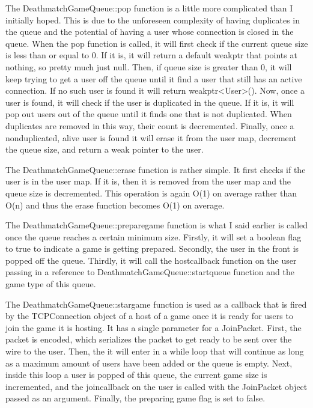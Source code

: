 \documentclass[conference]{IEEEtran}
\begin{document}
The DeathmatchGameQueue::pop function is a little more complicated than I initially hoped.
This is due to the unforeseen complexity of having duplicates in the queue and the potential of having a user whose connection is closed in the queue.
When the pop function is called, it will first check if the current queue size is less than or equal to 0.
If it is, it will return a default weak\textunderscore ptr that points at nothing, so pretty much just null.
Then, if queue size is greater than 0, it will keep trying to get a user off the queue until it find a user that still has an active connection.
If no such user is found it will return weak\textunderscore ptr<User>().
Now, once a user is found, it will check if the user is duplicated in the queue.
If it is, it will pop out users out of the queue until it finds one that is not duplicated.
When duplicates are removed in this way, their count is decremented.
Finally, once a nonduplicated, alive user is found it will erase it from the user map, decrement the queue size, and return a weak pointer to the user.

The DeathmatchGameQueue::erase function is rather simple.
It first checks if the user is in the user map.
If it is, then it is removed from the user map and the queue size is decremented.
This operation is again O(1) on average rather than O(n) and thus the erase function becomes O(1) on average.

The DeathmatchGameQueue::prepare\textunderscore game function is what I said earlier is called once the queue reaches a certain minimum size.
Firstly, it will set a boolean flag to true to indicate a game is getting prepared.
Secondly, the user in the front is popped off the queue.
Thirdly, it will call the host\textunderscore callback function on the user passing in a reference to DeathmatchGameQueue::start\textunderscore queue function and the game type of this queue.

The DeathmatchGameQueue::star\textunderscore game function is used as a callback that is fired by the TCPConnection object of a host of a game once it is ready for users to join the game it is hosting.
It has a single parameter for a JoinPacket.
First, the packet is encoded, which serializes the packet to get ready to be sent over the wire to the user.
Then, the it will enter in a while loop that will continue as long as a maximum amount of users have been added or the queue is empty.
Next, inside this loop a user is popped of this queue, the current game size is incremented, and the join\textunderscore callback on the user is called with the JoinPacket object passed as an argument.
Finally, the preparing game flag is set to false.
\end{document}
